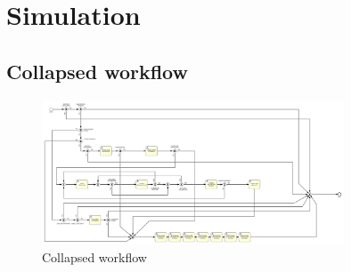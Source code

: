 \section{Simulation}

\subsection{Collapsed workflow}

\begin{figure}[H]
\centering
\includegraphics[width=0.8\textwidth]{figures/Collapsed Workflow SIM.png}
\caption{Collapsed workflow}
\label{fig:collapsed_workflow}
\end{figure}